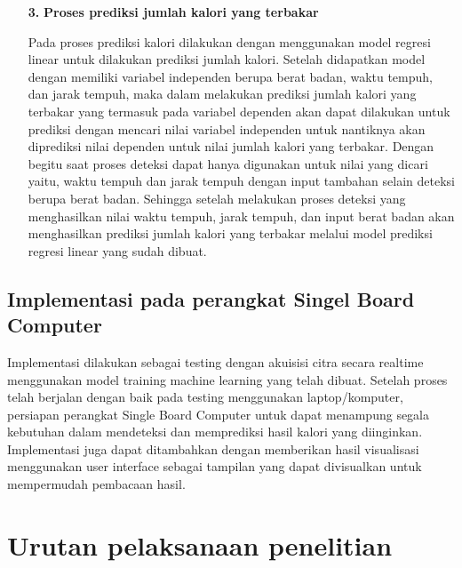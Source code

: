 \begin{enumerate}[listparindent=2em]
    \item[\textbf{3.}] \textbf{Proses prediksi jumlah kalori yang terbakar}

    Pada proses prediksi kalori dilakukan dengan menggunakan model regresi linear untuk dilakukan prediksi jumlah kalori. Setelah didapatkan model dengan memiliki variabel independen berupa berat badan, waktu tempuh, dan jarak tempuh, maka dalam melakukan prediksi jumlah kalori yang terbakar yang termasuk pada variabel dependen akan dapat dilakukan untuk prediksi dengan mencari nilai variabel independen untuk nantiknya akan diprediksi nilai dependen untuk nilai jumlah kalori yang terbakar. Dengan begitu saat proses deteksi dapat hanya digunakan untuk nilai yang dicari yaitu, waktu tempuh dan jarak tempuh dengan input tambahan selain deteksi berupa berat badan. Sehingga setelah melakukan proses deteksi yang menghasilkan nilai waktu tempuh, jarak tempuh, dan input berat badan akan menghasilkan prediksi jumlah kalori yang terbakar melalui model prediksi regresi linear yang sudah dibuat.

  \end{enumerate}
\subsection{Implementasi pada perangkat Singel Board Computer}

Implementasi dilakukan sebagai testing dengan akuisisi citra secara realtime menggunakan model training machine learning yang telah dibuat. Setelah proses telah berjalan dengan baik pada testing menggunakan laptop/komputer, persiapan perangkat Single Board Computer untuk dapat menampung segala kebutuhan dalam mendeteksi dan memprediksi hasil kalori yang diinginkan. Implementasi juga dapat ditambahkan dengan memberikan hasil visualisasi menggunakan user interface sebagai tampilan yang dapat divisualkan untuk mempermudah pembacaan hasil.





\section{Urutan pelaksanaan penelitian}

